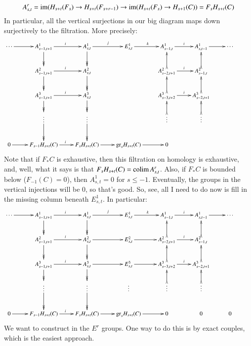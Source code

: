 $$
A^r_{s,t} = \operatorname{im}(H_{s+t}(F_s) \to H_{s+t}(F_{s+r-1}) \to \operatorname{im}(H_{s+t}(F_s) \to H_{s+1}(C)) = F_s H_{s+t}(C)
$$
In particular, all the vertical surjections in our big diagram maps down surjectively to the filtration.
More precisely:
\begin{equation*}
    \xymatrix{
	\cdots\ar[r] & A^1_{s-1,t+1}\ar@{->>}[d] \ar[r]^i & A^1_{s,t} \ar@{->>}[d] \ar[r]^j & E^1_{s,t} \ar[r]^k & A^1_{s-1,t}\ar[r]^i & A^1_{s,t-1} \ar[r] & \cdots\\
	& A^2_{s-1,t+1}\ar@{->>}[d]\ar[r]^i & A^2_{s,t}\ar@{->>}[d] & & A^2_{s-2,t+1}\ar[r]^i \ar@{>->}[u] & A^2_{s-1,t}\ar@{>->}[u] & \\
	& A^3_{s-1,t+1}\ar[r]^i\ar@{->>}[d] & A^3_{s,t}\ar@{->>}[d] & & A^3_{s-3,t+2}\ar@{>->}[u]\ar[r]^i & A^3_{s-2,t+1}\ar@{>->}[u] &\\
	& \vdots\ar@{->>}[d] & \vdots\ar@{->>}[d] & & \vdots \ar@{>->}[u] & \vdots\ar@{>->}[u] &\\
	0\ar[r] & F_{s-1} H_{s+t}(C) \ar[r]^i & F_s H_{s+t}(C) \ar[r] & \gr_s H_{s+t}(C)\ar[r] & 0 & & &
    }
\end{equation*}
Note that if $F_\ast C$ is exhaustive, then this filtration on homology is exhaustive, and, well, what it says is that $F_s H_{s+t}(C) = \operatorname{colim} A^r_{s,t}$.
Also, if $F_\ast C$ is bounded below ($F_{-1}(C) = 0$), then $A^1_{s,t} = 0$ for $s\leq -1$.
Eventually, the groups in the vertical injections will be $0$, so that's good.
So, see, all I need to do now is fill in the missing column beneath $E^1_{s,t}$.
In particular:
\begin{equation*}
    \xymatrix{
	\cdots\ar[r] & A^1_{s-1,t+1}\ar@{->>}[d] \ar[r]^i & A^1_{s,t} \ar@{->>}[d] \ar[r]^j & E^1_{s,t} \ar[r]^k & A^1_{s-1,t}\ar[r]^i & A^1_{s,t-1} \ar[r] & \cdots\\
	& A^2_{s-1,t+1}\ar@{->>}[d]\ar[r]^i & A^2_{s,t}\ar@{->>}[d]\ar[r] & E^2_{s,t}\ar[r] & A^2_{s-2,t+1}\ar[r]^i \ar@{>->}[u] & A^2_{s-1,t}\ar@{>->}[u] & \\
	& A^3_{s-1,t+1}\ar[r]^i\ar@{->>}[d] & A^3_{s,t}\ar@{->>}[d] \ar[r] & E^3_{s,t}\ar[r] & A^3_{s-3,t+2}\ar@{>->}[u]\ar[r]^i & A^3_{s-2,t+1}\ar@{>->}[u] &\\
	& \vdots\ar@{->>}[d] & \vdots\ar@{->>}[d] & \vdots & \vdots \ar@{>->}[u] & \vdots\ar@{>->}[u] &\\
	0\ar[r] & F_{s-1} H_{s+t}(C) \ar[r]^i & F_s H_{s+t}(C) \ar[r] & \gr_s H_{s+t}(C)\ar[r] & 0 & 0 & 0 &
    }
\end{equation*}
We want to construct in the $E^r$ groups.
One way to do this is by exact couples, which is the easiest approach.
